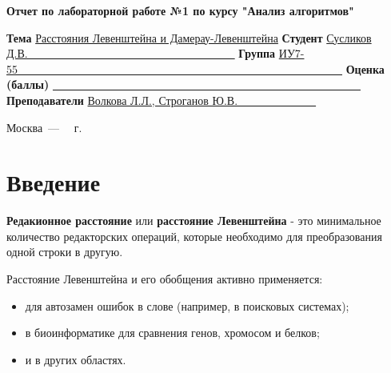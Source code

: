 \documentclass[12pt]{report}
\begin{document}
\begin{titlepage}
		
		\begin{center}
			\Large\textbf{Отчет по лабораторной работе №1 \newline по курсу "Анализ алгоритмов"}\newline
		\end{center}
		
		\noindent\textbf{Тема} \underline{Расстояния Левенштейна и Дамерау-Левенштейна}
		\newline\newline\newline
		\noindent\textbf{Студент} \underline{Сусликов Д.В.~~~~~~~~~~~~~~~~~~~~~~~~~~~~~~~~~~~~~}
		\newline\newline
		\noindent\textbf{Группа} \underline{ИУ7-55~~~~~~~~~~~~~~~~~~~~~~~~~~~~~~~~~~~~~~~~~~~~~~~~~~~~~~~~~~}
		\newline\newline
		\noindent\textbf{Оценка (баллы)} \underline{~~~~~~~~~~~~~~~~~~~~~~~~~~~~~~~~~~~~~~~~~~~~~~~~~~~~~~~}
		\newline\newline
		\noindent\textbf{Преподаватели} \underline{Волкова Л.Л., Строганов Ю.В.~~~~~~~~~~~~~~}
		\newline
		
		\begin{center}
			\vfill
			Москва~---~\the\year
			~г.
		\end{center}
		\restoregeometry
	\end{titlepage}
	
	\tableofcontents
	\onehalfspacing
	
	\newpage
	\chapter*{Введение}
	
	\textbf{Редакионное расстояние} или \textbf{расстояние Левенштейна} - это минимальное количество редакторских операций, которые необходимо для преобразования одной строки в другую.
	
	Расстояние Левенштейна и его обобщения активно применяется: 
	\begin{itemize}
		\item для автозамен ошибок в слове (например, в поисковых системах);
		\item в биоинформатике для сравнения генов, хромосом и белков;
		\item и в других областях.
	\end{itemize}
	
\end{document}
